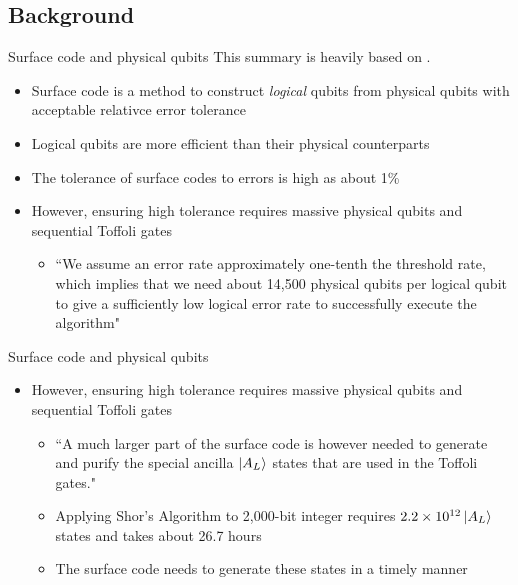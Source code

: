 \documentclass{beamer}
\begin{document}
    \subsection{Background}
    \begin{frame}{Surface code and physical qubits}
        This summary is heavily based on \cite{Fowler_2012}.
        \begin{itemize}
            \item Surface code is a method to construct \textit{logical} qubits from physical qubits with acceptable relativce error tolerance \cite{calderbank1997quantum}
            \item Logical qubits are more efficient than their physical counterparts
            \item The tolerance of surface codes to errors is high as about 1\%
            \item However, ensuring high tolerance requires massive physical qubits and sequential Toffoli gates
            \begin{itemize}
                \item ``We assume an error rate approximately one-tenth the threshold rate, which implies that we need about 14,500 physical qubits per logical qubit to give a sufficiently low logical error rate to successfully execute the algorithm"
            \end{itemize}
        \end{itemize}
    \end{frame}
    
    \begin{frame}[t]{Surface code and physical qubits}
        \begin{itemize}
            \item However, ensuring high tolerance requires massive physical qubits and sequential Toffoli gates
            \begin{itemize}
                \item ``A much larger part of the surface code is however needed to generate and purify the special ancilla $\ket{A_L}$ states that are used in the Toffoli gates."
                \item Applying Shor's Algorithm to 2,000-bit integer requires $ 2.2 \times 10^{12} \ket{A_L}$ states and takes about 26.7 hours
                \item The surface code needs to generate these states in a timely manner
            \end{itemize}
        \end{itemize}
    \end{frame}
    
\end{document}
